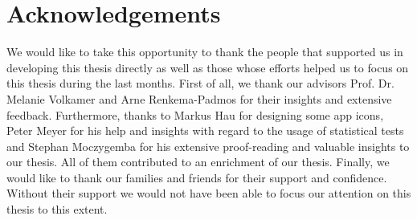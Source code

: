 \section*{Acknowledgements}

We would like to take this opportunity to thank the people that supported us in developing this thesis directly as well as those whose efforts helped us to focus on this thesis during the last months. First of all, we thank our advisors Prof. Dr. Melanie Volkamer and Arne Renkema-Padmos for their insights and extensive feedback.
Furthermore, thanks to Markus Hau for designing some app icons, Peter Meyer for his help and insights with regard to the usage of statistical tests and Stephan Moczygemba for his extensive proof-reading and valuable insights to our thesis. All of them contributed to an enrichment of our thesis.
Finally, we would like to thank our families and friends for their support and confidence. Without their support we would not have been able to focus our attention on this thesis to this extent.